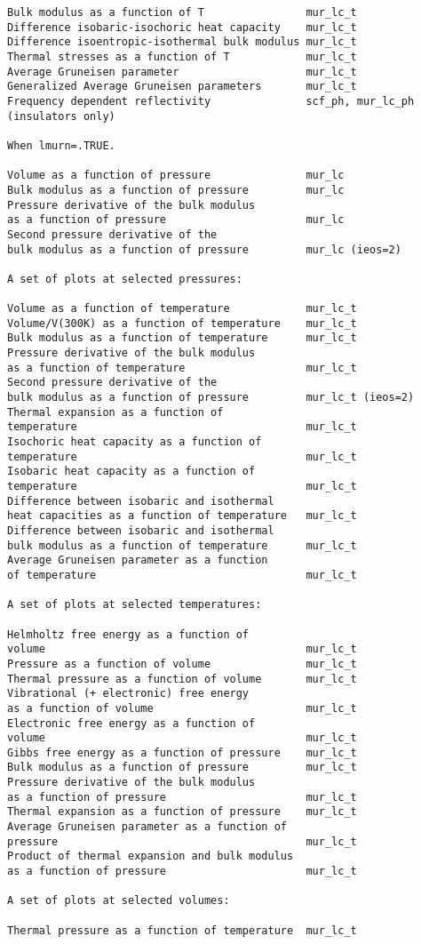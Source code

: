 \documentclass[12pt,a4paper,twoside]{report}
\begin{document}
\begin{footnotesize}
\begin{verbatim}
Bulk modulus as a function of T                mur_lc_t
Difference isobaric-isochoric heat capacity    mur_lc_t
Difference isoentropic-isothermal bulk modulus mur_lc_t
Thermal stresses as a function of T            mur_lc_t
Average Gruneisen parameter                    mur_lc_t
Generalized Average Gruneisen parameters       mur_lc_t     
Frequency dependent reflectivity               scf_ph, mur_lc_ph
(insulators only)

When lmurn=.TRUE.

Volume as a function of pressure               mur_lc
Bulk modulus as a function of pressure         mur_lc
Pressure derivative of the bulk modulus 
as a function of pressure                      mur_lc
Second pressure derivative of the
bulk modulus as a function of pressure         mur_lc (ieos=2)

A set of plots at selected pressures:

Volume as a function of temperature            mur_lc_t
Volume/V(300K) as a function of temperature    mur_lc_t
Bulk modulus as a function of temperature      mur_lc_t
Pressure derivative of the bulk modulus        
as a function of temperature                   mur_lc_t
Second pressure derivative of the              
bulk modulus as a function of pressure         mur_lc_t (ieos=2)
Thermal expansion as a function of             
temperature                                    mur_lc_t
Isochoric heat capacity as a function of       
temperature                                    mur_lc_t
Isobaric heat capacity as a function of        
temperature                                    mur_lc_t
Difference between isobaric and isothermal     
heat capacities as a function of temperature   mur_lc_t
Difference between isobaric and isothermal     
bulk modulus as a function of temperature      mur_lc_t
Average Gruneisen parameter as a function     
of temperature                                 mur_lc_t

A set of plots at selected temperatures:

Helmholtz free energy as a function of         
volume                                         mur_lc_t
Pressure as a function of volume               mur_lc_t
Thermal pressure as a function of volume       mur_lc_t
Vibrational (+ electronic) free energy         
as a function of volume                        mur_lc_t
Electronic free energy as a function of        
volume                                         mur_lc_t
Gibbs free energy as a function of pressure    mur_lc_t
Bulk modulus as a function of pressure         mur_lc_t
Pressure derivative of the bulk modulus        
as a function of pressure                      mur_lc_t
Thermal expansion as a function of pressure    mur_lc_t
Average Gruneisen parameter as a function of   
pressure                                       mur_lc_t
Product of thermal expansion and bulk modulus
as a function of pressure                      mur_lc_t

A set of plots at selected volumes:

Thermal pressure as a function of temperature  mur_lc_t

\end{verbatim}
\end{footnotesize}
\end{document}

